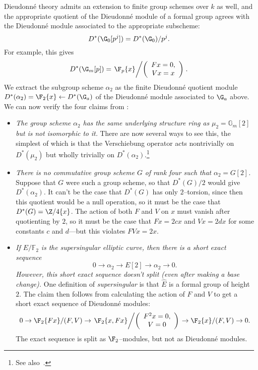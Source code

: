 \begin{example}\label{WorkedAlpha2Example}
Dieudonn\'e theory admits an extension to finite group schemes over \(k\) as well, and the appropriate quotient of the Dieudonn\'e module of a formal group agrees with the Dieudonn\'e module associated to the appropriate subscheme: \[D^*(\G_0[p^j]) = D^*(\G_0) / p^j.\]  For example, this gives \[D^*(\G_m[p]) = \left.\F_p\{x\} \middle/\left(\begin{array}{c} Fx = 0, \\ Vx = x \end{array}\right)\right. .\]  We extract the subgroup scheme \(\alpha_2\) as the finite Dieudonn\'e quotient module \(D^*(\alpha_2) = \F_2\{x\} \leftarrow D^*(\G_a)\) of the Dieudonn\'e module associated to \(\G_a\) above.  We can now verify the four claims from :
\begin{itemize}
\item \textit{The group scheme \(\alpha_2\) has the same underlying structure ring as \(\mu_2 = \mathbb{G}_m[2]\) but is not isomorphic to it.}  There are now several ways to see this, the simplest of which is that the Verschiebung operator acts nontrivially on \(D^*(\mu_2)\) but wholly trivially on \(D^*(\alpha_2)\).\footnote{See also~\cite[Example 8.5]{StricklandFPFP}.}
\item \textit{There is no commutative group scheme \(G\) of rank four such that \(\alpha_2 = G[2]\).}  Suppose that \(G\) were such a group scheme, so that \(D^*(G) / 2\) would give \(D^*(\alpha_2)\).  It can't be the case that \(D^*(G)\) has only \(2\)--torsion, since then this quotient would be a null operation, so it must be the case that \(D^*(G) = \Z/4\{x\}\).  The action of both \(F\) and \(V\) on \(x\) must vanish after quotienting by \(2\), so it must be the case that \(Fx = 2cx\) and \(Vx = 2dx\) for some constants \(c\) and \(d\)---but this violates \(FVx = 2x\).
\item \textit{If \(E/\mathbb{F}_2\) is the supersingular elliptic curve, then there is a short exact sequence \[0 \rightarrow \alpha_2 \rightarrow E[2] \rightarrow \alpha_2 \rightarrow 0.\]  However, this short exact sequence doesn't split (even after making a base change).}  One definition of \textit{supersingular} is that \(\widehat E\) is a formal group of height \(2\).  The claim then follows from calculating the action of \(F\) and \(V\) to get a short exact sequence of Dieudonn\'e modules: \[0 \to \F_2\{Fx\}/(F, V) \to \left.\F_2\{x, Fx\} \middle/ \left( \begin{array}{c} F^2x = 0, \\ V = 0 \end{array}\right) \right. \to \F_2\{x\}/(F, V) \to 0.\]  The exact sequence is split as \(\F_2\)--modules, but not as Dieudonn\'e modules.

\end{itemize}
\end{example}
